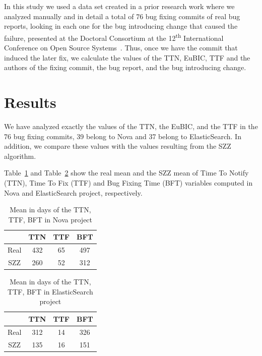 \documentclass[10pt, conference]{IEEEtran}
\begin{document}
In this study we used a data set created in a prior research work where we analyzed manually and in detail a total of 76 bug fixing commits of real bug reports, looking in each one for the bug introducing change that caused the failure, presented at the Doctoral Consortium at the 12\textsuperscript{th} International Conference on Open Source Systems~\cite{crowston2016proceedings}. Thus, once we have the commit that induced the later fix, we calculate the values of the TTN, EuBIC, TTF and the authors of the fixing commit, the bug report, and the bug introducing change.  


\section{Results}
\label{sec:results}

We have analyzed exactly the values of the TTN, the EuBIC, and the TTF in the 76 bug fixing commits, 39 belong to Nova and 37 belong to ElasticSearch. In addition, we compare these values with the values resulting from the SZZ algorithm.

Table~\ref{tableNova} and Table~\ref{tableES} show the real mean and the SZZ mean of Time To Notify (TTN), Time To Fix (TTF) and Bug Fixing Time (BFT) variables computed in Nova and ElasticSearch project, respectively. 

\begin{table}[!t]
\renewcommand{\arraystretch}{1.3}
\centering
\caption{Mean in days of the TTN, TTF, BFT in Nova project}
\label{tableNova}
\begin{tabular}{|c||c||c||c| }
\hline
  & TTN & TTF & BFT \\
\hline
Real & 432 & 65 & 497 \\
\hline
SZZ & 260 & 52 & 312\\
\hline
\end{tabular}
\end{table}

\begin{table}[!t]
\renewcommand{\arraystretch}{1.3}
\centering
\caption{Mean in days of the TTN, TTF, BFT in ElasticSearch project}
\label{tableES}
\begin{tabular}{|c||c||c||c| }
\hline
  & TTN & TTF & BFT \\
\hline
Real & 312 & 14 & 326 \\
\hline
SZZ & 135 & 16 & 151\\
\hline
\end{tabular}
\end{table}
\end{document}
